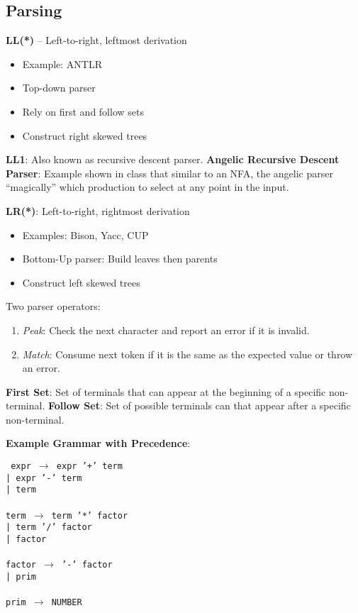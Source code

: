 \documentclass[10pt]{report}
\begin{document}
\begin{multicols}{2}
    \section{Parsing}
    
    \textbf{LL(*)} -- Left-to-right, leftmost derivation
    \begin{itemize}
      \item Example: ANTLR
      \item Top-down parser
      \item Rely on first and follow sets
      \item Construct right skewed trees
    \end{itemize}
    \textbf{LL1}: Also known as recursive descent parser.
    \textbf{Angelic Recursive Descent Parser}: Example shown in class that similar to an NFA, the angelic parser ``magically'' which production to select at any point in the input.
  
    \textbf{LR(*)}: Left-to-right, rightmost derivation
    \begin{itemize}
      \item Examples: Bison, Yacc, CUP 
      \item Bottom-Up parser: Build leaves then parents
      \item Construct left skewed trees
    \end{itemize}
  
    Two parser operators:
    \begin{enumerate}
      \item \textit{Peak}: Check the next character and report an error if it is invalid.
      \item \textit{Match}: Consume next token if it is the same as the expected value or throw an error.
    \end{enumerate}
  
    \textbf{First Set}: Set of terminals that can appear at the beginning of a specific non-terminal. \textbf{Follow Set}: Set of possible terminals can that appear after a specific non-terminal.
    
    \textbf{Example Grammar with Precedence}:
    
    \texttt{%
    expr $\rightarrow$ expr '+' term\\
    \hbox{\hspace{30pt}}| expr '-' term\\
    \hbox{\hspace{30pt}}| term\\
    \\
    term $\rightarrow$ term '*' factor\\
    \hbox{\hspace{30pt}}| term '/' factor\\
    \hbox{\hspace{30pt}}| factor\\
    \\
    factor $\rightarrow$ '-' factor\\
    \hbox{\hspace{39pt}}| prim\\
    \\
    prim $\rightarrow$ NUMBER}
    

\end{multicols}
\end{document}
